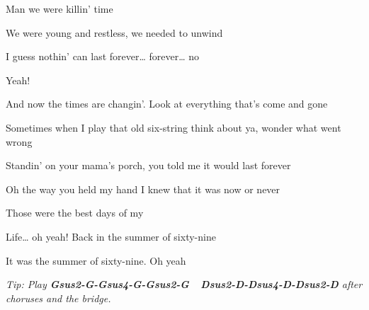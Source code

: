 \begin{song}
\bigskip

 Man we were killin’ time \par
We were young and restless, we needed to unwind \par
{} I guess nothin’ can last forever… forever… no \par
{}Yeah!    \par

\bigskip

 And now the times are changin’.  Look at everything that’s come and gone \par
{} Sometimes when I play that old six-string  think about ya, wonder what went wrong \par

\bigskip

 Standin’ on your mama’s porch,  you told me it would last forever \par
{} Oh the way you held my hand  I knew that it was now or never \par
{} Those were the best days of my \par
{}Life… oh yeah! Back in the summer of sixty-nine  \par
It was the summer of sixty-nine. Oh yeah   \par
{} \par

\bigskip

\bigskip

\bigskip

{\it\smaller
Tip: Play \textbf{Gsus2-G-Gsus4-G-Gsus2-G\ \ Dsus2-D-Dsus4-D-Dsus2-D} after choruses and the bridge.
}


\end{song}
